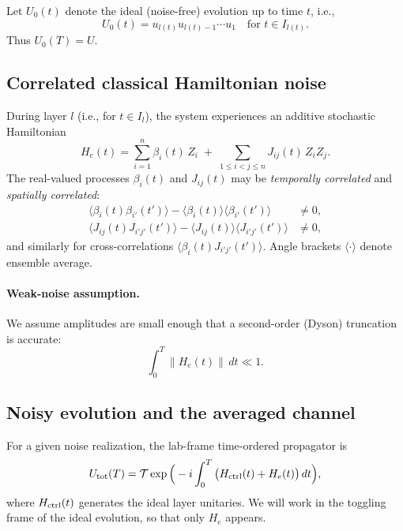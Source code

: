 \documentclass[11pt]{article}
\begin{document}
Let $U_0(t)$ denote the ideal (noise-free) evolution up to time $t$, i.e.,
\begin{equation}
U_0(t)=u_{l(t)}u_{l(t)-1}\cdots u_1\quad\text{for } t\in I_{l(t)}.
\end{equation}
Thus $U_0(T)=U$.

\subsection{Correlated classical Hamiltonian noise}
During layer $l$ (i.e., for $t\in I_l$), the system experiences an additive stochastic Hamiltonian
\begin{equation}
H_e(t)=\sum_{i=1}^n \beta_i(t)\,Z_i \;+\; \sum_{1\le i<j\le n} J_{ij}(t)\,Z_iZ_j.
\label{eq:He}
\end{equation}
The real-valued processes $\beta_i(t)$ and $J_{ij}(t)$ may be \emph{temporally correlated} and \emph{spatially correlated}:
\begin{align}
\langle \beta_i(t)\beta_{i'}(t')\rangle - \langle \beta_i(t)\rangle\langle \beta_{i'}(t')\rangle &\neq 0,\\
\langle J_{ij}(t)J_{i'j'}(t')\rangle - \langle J_{ij}(t)\rangle\langle J_{i'j'}(t')\rangle &\neq 0,
\end{align}
and similarly for cross-correlations $\langle \beta_i(t)J_{i'j'}(t')\rangle$. Angle brackets $\langle\cdot\rangle$ denote ensemble average.

\paragraph{Weak-noise assumption.}
We assume amplitudes are small enough that a second-order (Dyson) truncation is accurate:
\begin{equation}
\int_0^T \|H_e(t)\|\,dt \ll 1.
\end{equation}

\subsection{Noisy evolution and the averaged channel}
For a given noise realization, the lab-frame time-ordered propagator is
\begin{equation}
U_{\rm tot}(T)=\mathcal{T}\exp\Big(-i\int_0^T \big(H_{\rm ctrl}(t)+H_e(t)\big)\,dt\Big),
\end{equation}
where $H_{\rm ctrl}(t)$ generates the ideal layer unitaries. We will work in the toggling frame of the ideal evolution, so that only $H_e$ appears.
\end{document}
